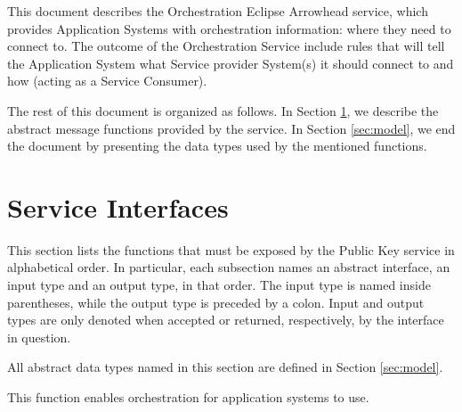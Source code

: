 \documentclass[a4paper]{arrowhead}
\begin{document}
This document describes the Orchestration Eclipse Arrowhead service, which provides Application Systems with orchestration information: where they need to connect to. The outcome of the Orchestration Service include rules that will tell the Application System what Service provider System(s) it should connect to and how (acting as a Service Consumer).

The rest of this document is organized as follows.
In Section \ref{sec:functions}, we describe the abstract message functions provided by the service.
In Section \ref{sec:model}, we end the document by presenting the data types used by the mentioned functions.

\newpage

\section{Service Interfaces}
\label{sec:functions}

This section lists the functions that must be exposed by the Public Key service in alphabetical order.
In particular, each subsection names an abstract interface, an input type and an output type, in that order.
The input type is named inside parentheses, while the output type is preceded by a colon.
Input and output types are only denoted when accepted or returned, respectively, by the interface in question.

All abstract data types named in this section are defined in Section \ref{sec:model}.


This function enables orchestration for application systems to use.
\end{document}
